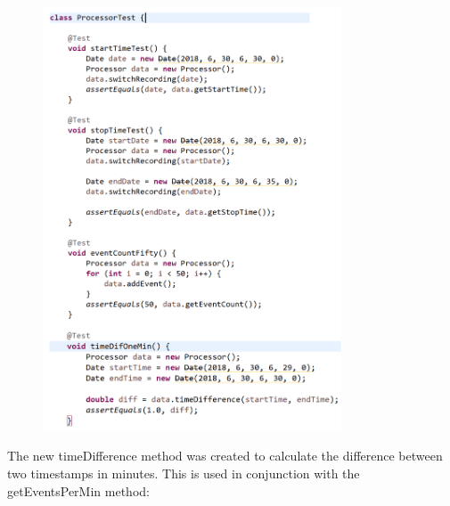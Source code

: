 \documentclass[11pt,a4paper]{article}
\begin{document}
\begin{figure}[h]
	\includegraphics[width=0.79\textwidth]{codeimg4.png}
	\end{figure}

The new timeDifference method was created to calculate the difference between two timestamps in minutes. This is used in conjunction with the getEventsPerMin method:
\end{document}
